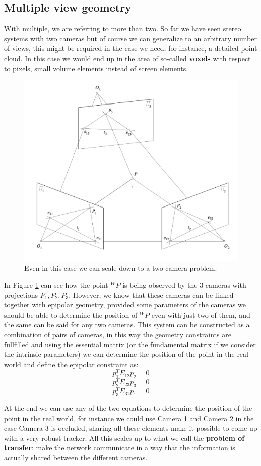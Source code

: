 \subsection{Multiple view geometry}

With multiple, we are referring to more than two. So far we have seen stereo systems with two cameras but of course we can generalize to an arbitrary number of views, this might be required in the case we need, for instance, a detailed point cloud. In this case we would end up in the area of so-called \textbf{voxels} with respect to pixels, small volume elements instead of screen elements.

\begin{figure}[H]
    \centering
    \includegraphics[scale=0.35]{Figures/multiv.png}
    \caption{Even in this case we can scale down to a two camera problem.}
    \label{fig:multiv}
\end{figure}

In Figure \ref{fig:multiv} can see how the point \({}^WP\) is being observed by the 3 cameras with projections \(P_1, P_2, P_3\). However, we know that these cameras can be linked together with epipolar geometry, provided some parameters of the cameras we should be able to determine the position of \({}^WP\) even with just two of them, and the same can be said for any two cameras. This system can be constructed as a combination of pairs of cameras, in this way the geometry constraints are fullfilled and using the essential matrix (or the fundamental matrix if we consider the intrinsic parameters) we can determine the position of the point in the real world and define the epipolar constraint as:
\[
    p^T_1E_{12}p_2=0
\]
\[
    p^T_2E_{23}p_3=0
\]
\[
    p^T_3E_{31}p_1=0
\]


At the end we can use any of the two equations to determine the position of the point in the real world, for instance we could use Camera 1 and Camera 2 in the case Camera 3 is occluded, sharing all these elements make it possible to come up with a very robust tracker. All this scales up to what we call the \textbf{problem of transfer}: make the network communicate in a way that the information is actually shared between the different cameras.
